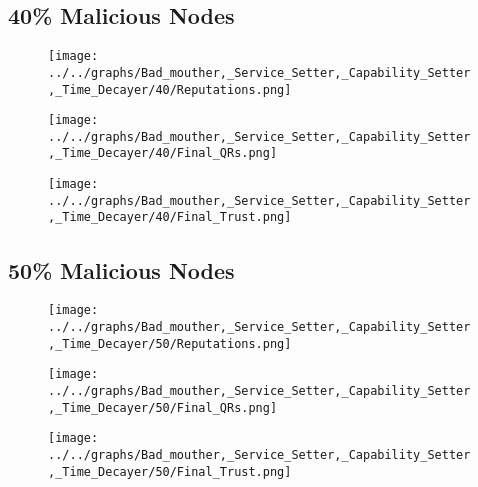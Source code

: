 \begin{minipage}[t]{0.49\columnwidth}
\subsection*{40\% Malicious Nodes}
    \begin{figure}[H]
        \centering
        \texttt{[image: ../../graphs/Bad\_mouther,\_Service\_Setter,\_Capability\_Setter,\_Time\_Decayer/40/Reputations.png]}
    \end{figure}
    \begin{figure}[H]
        \centering
        \texttt{[image: ../../graphs/Bad\_mouther,\_Service\_Setter,\_Capability\_Setter,\_Time\_Decayer/40/Final\_QRs.png]}
    \end{figure}
\end{minipage}
\begin{minipage}[t]{0.49\columnwidth}
    \begin{figure}[H]
        \centering
        \texttt{[image: ../../graphs/Bad\_mouther,\_Service\_Setter,\_Capability\_Setter,\_Time\_Decayer/40/Final\_Trust.png]}
    \end{figure}
\end{minipage}

\begin{minipage}[t]{0.49\columnwidth}
\subsection*{50\% Malicious Nodes}
    \begin{figure}[H]
        \centering
        \texttt{[image: ../../graphs/Bad\_mouther,\_Service\_Setter,\_Capability\_Setter,\_Time\_Decayer/50/Reputations.png]}
    \end{figure}
    \begin{figure}[H]
        \centering
        \texttt{[image: ../../graphs/Bad\_mouther,\_Service\_Setter,\_Capability\_Setter,\_Time\_Decayer/50/Final\_QRs.png]}
    \end{figure}
\end{minipage}
\begin{minipage}[t]{0.49\columnwidth}
    \begin{figure}[H]
        \centering
        \texttt{[image: ../../graphs/Bad\_mouther,\_Service\_Setter,\_Capability\_Setter,\_Time\_Decayer/50/Final\_Trust.png]}
    \end{figure}
\end{minipage}

